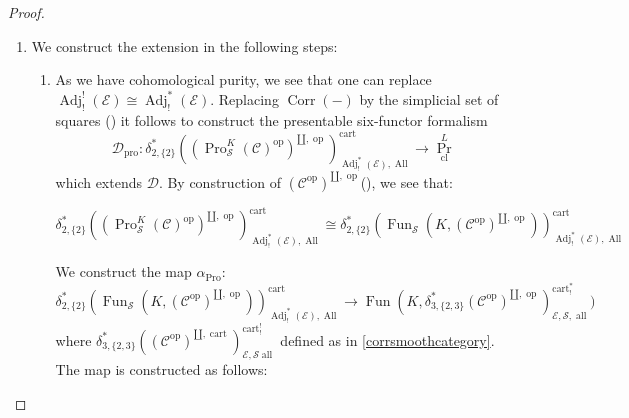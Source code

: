 \documentclass[14pt]{article}
\theoremstyle{definition}
\newcommand{\E}{\mathcal{E}}
\newcommand{\D}{\mathcal{D}}
\newcommand{\op}[1]{\operatorname{#1}}
\renewcommand{\S}{\mathcal{S}}
\newcommand{\dd}{\delta}
\newcommand{\Ca}{\mathcal{C}}
\numberwithin{subsection}{section}
\begin{document}
\begin{proof} 
    \begin{enumerate}
    \item We construct the extension in the following steps: 
    \begin{enumerate}
  
    \item As we have cohomological purity, we see that one can replace $\op{Adj}^!_!(\E) \cong \op{Adj}^*_!(\E)$. Replacing $\op{Corr}(-)$ by the simplicial set of squares (\cite[Proposition 4.2.3]{chowdhury2025sixfunctorformalismsiiiconstruction}) it follows to construct the presentable six-functor formalism 
        \begin{equation}
            \D_{\op{pro}} : \delta^*_{2,\{2\}}((\op{Pro}^K_{\S}(\Ca)^{\op{op}})^{\amalg,\op{op}})^{\op{cart}}_{\op{Adj}^*_!(\E),\op{All}} \to \op{Pr}^L_{\op{cl}}
        \end{equation} which extends $\D$. By construction of $(\Ca^{\op{op}})^{\amalg,\op{op}}$(\cite[Construction 2.4.3,1]{HA}), we see that:

        \begin{equation}
            \delta^*_{2,\{2\}}((\op{Pro}^K_{\S}(\Ca)^{\op{op}})^{\amalg,\op{op}})^{\op{cart}}_{\op{Adj}^*_!(\E),\op{All} }\cong \dd^*_{2,\{2\}}(\op{Fun}_{\S}(K,(\Ca^{\op{op}})^{\amalg,\op{op}}))^{\op{cart}}_{\op{Adj}^*_!(\E),\op{All}}
        \end{equation}
        
We construct the map  $\alpha_{\op{Pro}}$:
\begin{equation}
   \dd^*_{2,\{2\}}(\op{Fun}_{\S}(K,(\Ca^{\op{op}})^{\amalg,\op{op}}))^{\op{cart}}_{\op{Adj}^*_!(\E),\op{All}}\to \op{Fun}(K,\delta^*_{3,\{2,3\}}(\Ca^{\op{op}})^{\amalg,\op{op}})^{\op{cart}^*_!}_{\E,\S,\op{all}})
\end{equation}
where $\delta^*_{3,\{2,3\}}((\Ca^{\op{op}})^{\amalg,\op{cart}})^{\op{cart}^!_!}_{\E,\S\op{all}}$  defined as in \cref{corrsmoothcategory}. The map is constructed as follows:\\


\end{enumerate}
\end{enumerate}
\end{proof}
\end{document}
